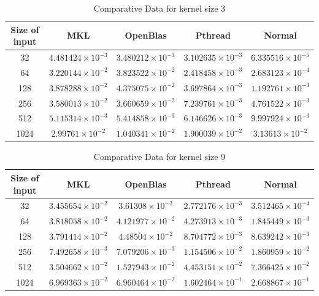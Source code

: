 \documentclass[a4paper]{article}
\begin{document}
\begin{table}[ht]
\caption{Comparative Data for kernel size 3} %
\centering %
\begin{tabular}{c c c c c} %
\hline\hline %
Size of input & MKL & OpenBlas & Pthread & Normal \\ [0.5ex] %
\hline %
32 & $4.481424\times 10^{-3}$ & $3.480212\times 10^{-3}$ & $3.102635\times 10^{-3}$ & $6.335516\times 10^{-5}$  \\
64 & $3.220144\times 10^{-2}$ & $3.823522\times 10^{-2}$ & $2.418458\times 10^{-3}$ & $2.683123\times 10^{-4}$  \\
128 & $3.878288\times 10^{-2}$ & $4.375075\times 10^{-2}$ & $3.697864\times 10^{-3}$ & $1.192761\times 10^{-3}$  \\
256 & $3.580013\times 10^{-2}$ & $3.660659\times 10^{-2}$ & $7.239761\times 10^{-3}$ & $4.761522\times 10^{-3}$  \\
512 & $5.115314\times 10^{-3}$ & $5.414858\times 10^{-3}$ & $6.146626\times 10^{-3}$ & $9.997924\times 10^{-3}$  \\
1024 & $2.99761\times 10^{-2}$ & $1.040341\times 10^{-2}$ & $1.900039\times 10^{-2}$ & $3.13613\times 10^{-2}$  \\[1ex] %
\hline %
\end{tabular}
\label{table:nonlin} %
\end{table}


\begin{table}[ht]
\caption{Comparative Data for kernel size 9} %
\centering %
\begin{tabular}{c c c c c} %
\hline\hline %
Size of input & MKL & OpenBlas & Pthread & Normal \\ [0.5ex] %
\hline %
32 & $3.455654\times 10^{-2}$ & $3.61308\times 10^{-2}$ & $2.772176\times 10^{-3}$ & $3.512465\times 10^{-4}$  \\
64 & $3.818058\times 10^{-2}$ & $4.121977\times 10^{-2}$ & $4.273913\times 10^{-3}$ & $1.845449\times 10^{-3}$  \\
128 & $3.791414\times 10^{-2}$ & $4.48504\times 10^{-2}$ & $8.704772\times 10^{-3}$ & $8.639242\times 10^{-3}$  \\
256 & $7.492658\times 10^{-3}$ & $7.079206\times 10^{-3}$ & $1.154506\times 10^{-2}$ & $1.860959\times 10^{-2}$  \\
512 & $3.504662\times 10^{-2}$ & $1.527943\times 10^{-2}$ & $4.453151\times 10^{-2}$ & $7.366425\times 10^{-2}$  \\
1024 & $6.969363\times 10^{-2}$ & $6.960464\times 10^{-2}$ & $1.602464\times 10^{-1}$ & $2.668867\times 10^{-1}$  \\[1ex] %
\hline %
\end{tabular}
\label{table:nonn} %
\end{table}
\end{document}
